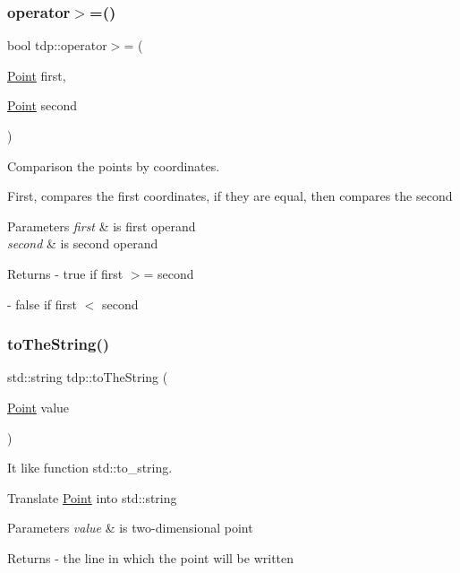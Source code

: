\subsubsection{\texorpdfstring{operator$>$=()}{operator>=()}}
{\footnotesize\ttfamily bool tdp\+::operator$>$= (\begin{DoxyParamCaption}\item[{\mbox{\hyperlink{structtdp_1_1_point}{Point}}}]{first,  }\item[{\mbox{\hyperlink{structtdp_1_1_point}{Point}}}]{second }\end{DoxyParamCaption})}



Comparison the points by coordinates. 

First, compares the first coordinates, if they are equal, then compares the second 
\begin{DoxyParams}{Parameters}
{\em first} & is first operand \\
\hline
{\em second} & is second operand \\
\hline
\end{DoxyParams}
\begin{DoxyReturn}{Returns}
-\/ true if \textquotesingle{}first\textquotesingle{} $>$= \textquotesingle{}second\textquotesingle{} 

-\/ false if \textquotesingle{}first\textquotesingle{} $<$ \textquotesingle{}second\textquotesingle{} 
\end{DoxyReturn}
\mbox{\label{namespacetdp_ade7149690123950b10455ece39159e94}} 
\subsubsection{\texorpdfstring{to\+The\+String()}{toTheString()}}
{\footnotesize\ttfamily std\+::string tdp\+::to\+The\+String (\begin{DoxyParamCaption}\item[{\mbox{\hyperlink{structtdp_1_1_point}{Point}}}]{value }\end{DoxyParamCaption})}



It like function std\+::to\+\_\+string. 

Translate \mbox{\hyperlink{structtdp_1_1_point}{Point}} into std\+::string 
\begin{DoxyParams}{Parameters}
{\em value} & is two-\/dimensional point \\
\hline
\end{DoxyParams}
\begin{DoxyReturn}{Returns}
-\/ the line in which the point will be written 
\end{DoxyReturn}
